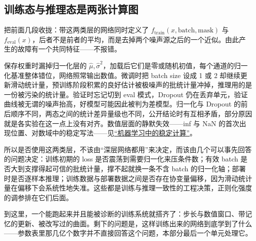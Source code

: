 \subsection{训练态与推理态是两张计算图}

把前面几段收拢：带这两类层的网络同时定义了 \(f_{\text{train}}(x,\text{batch},\text{mask})\) 与 \(f_{\text{eval}}(x)\)，后者不是前者的平均，而是去掉两个噪声源之后的一个近似。由此产生的故障有一个共同特征——不报错。

保存权重时漏掉归一化层的 \(\widehat\mu,\widehat\sigma^2\)，加载后它们是零或随机初值，每个通道的归一化基准整体错位，网络照常输出数值。微调时把 batch size 设成 1 或 2 却继续更新滑动统计量，预训练阶段积累的良好估计被极噪声的批统计量冲掉，推理用的是一份被污染的统计量。验证时忘记切到 eval 模式，Dropout 仍在丢弃单元，验证曲线被无谓的噪声抬高，好模型可能因此被判为差模型。归一化与 Dropout 的前后顺序不同，两态之间的统计差异量级也不同，公开结论时有互相矛盾，部分原因就是各实验在这一点上没有对齐。数值层面的静默失效——inf 与 NaN 的首次出现位置、对数域中的稳定写法——见\hyperref[ch:067]{``机器学习中的稳定计算''}。

所以是否使用这两类层，不该由``深层网络都用''来决定，而该由几个可以事先回答的问题决定：训练初期的 loss 是否震荡到需要归一化来压条件数；有效 batch 是否大到支撑得起可信的批统计量，撑不起就换一条不含 batch 的归一化轴；部署时是否逐样本推理；训练数据与部署数据之间是否存在协变量偏移，因为滑动统计量在偏移下会系统性地失准。这些都是训练与推理一致性的工程决策，正则化强度的调参排在它们后面。

到这里，一个能跑起来并且能被诊断的训练系统就搭齐了：步长与数值窗口、带记忆的更新、被改写过的曲面。剩下的问题是，这样训练出来的网络到底学到了什么——参数表里那几亿个数字并不直接回答这个问题，本部分最后一个单元处理它。
